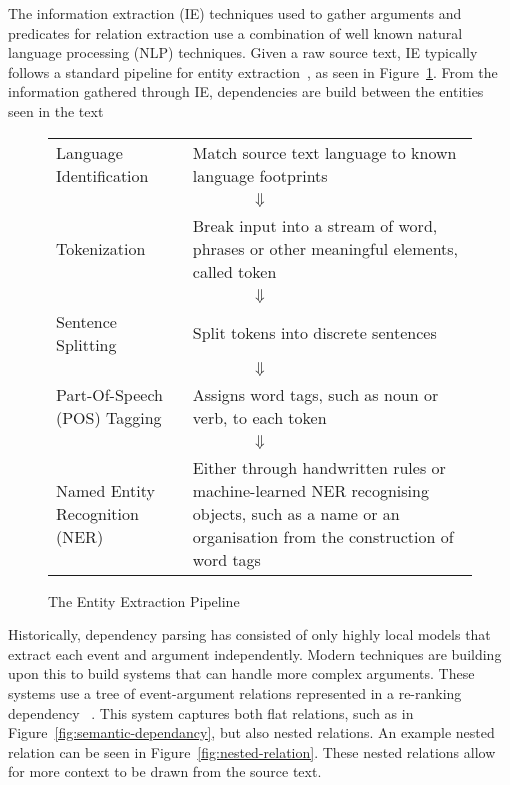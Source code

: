 \documentclass[bsc,frontabs,twoside,singlespacing,parskip,deptreport]{infthesis}     %
\begin{document}
The information extraction (IE) techniques used to gather arguments and predicates for relation extraction use a combination
of well known natural language processing (NLP) techniques. 
Given a raw source text, IE typically follows a standard pipeline for entity extraction~\cite{bontcheva2013twitie}, as seen in Figure~\ref{fig:pipeline}.
From the information gathered through IE, dependencies are build between the entities seen in the text
\begin{figure}[H]
\begin{tcolorbox}[width=\textwidth,
                  interior hidden,
                  boxsep=10pt,
                  left=0pt,
                  right=0pt,
                  top=2pt]

 \begin{tabularx}{\linewidth}{lX}

 Language Identification &  Match source text language to known language footprints\\
  \multicolumn{2}{c}{$\Downarrow$} \\
 Tokenization &  Break input into a stream of word, phrases or other meaningful elements, called token\\

  \multicolumn{2}{c}{$\Downarrow$} \\
 Sentence Splitting &  Split tokens into discrete sentences\\

  \multicolumn{2}{c}{$\Downarrow$} \\
 Part-Of-Speech (POS) Tagging &   Assigns word tags, such as noun or verb, to each token\\

  \multicolumn{2}{c}{$\Downarrow$} \\
 Named Entity Recognition (NER) &   Either through handwritten rules or machine-learned NER recognising objects, such as a name or an
    organisation from the construction of word tags

 \end{tabularx}
\end{tcolorbox}
\caption{The Entity Extraction Pipeline}
\label{fig:pipeline}
\end{figure}


Historically, dependency parsing has consisted of only highly local models that extract each event and argument independently.
Modern techniques are building upon this to build systems that can handle more complex arguments. These systems use a tree of
event-argument relations represented in a re-ranking dependency ~\cite{mcclosky2011event}.
This system captures both flat relations, such as in Figure~\ref{fig:semantic-dependancy}, but also nested relations.
An example nested relation can be seen in Figure~\ref{fig:nested-relation}. These nested relations allow for more context to be drawn from
the source text.
\end{document}
